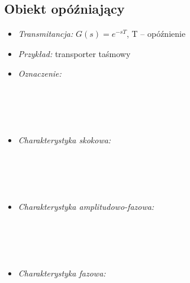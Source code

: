 \documentclass[a4paper]{article}
\begin{document}
\subsection{Obiekt opóźniający}
\begin{itemize}
\item \emph{Transmitancja: } $G(s) = e^{-sT}$, T -- opóźnienie
\item \emph{Przykład: }  transporter taśmowy
\item \emph {Oznaczenie: } \\\\\\\\\\
\item \emph{Charakterystyka skokowa: } \\\\\\\\\\
\item \emph{Charakterystyka amplitudowo-fazowa: } \\\\\\\\\\
\item \emph{Charakterystyka fazowa: } \\\\\\\\\\
\end{itemize}
\iffalse
\end{document}
